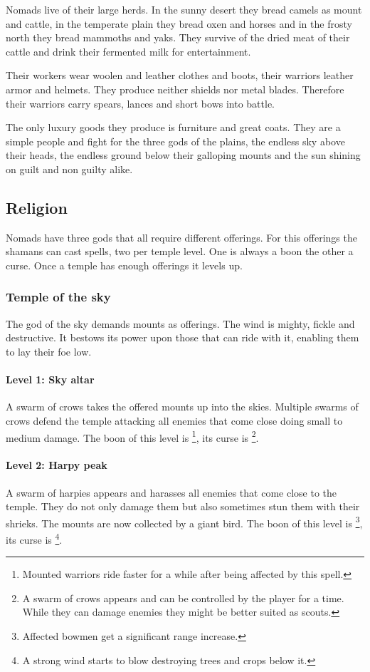 \documentclass[a4paper]{book}
\begin{document}
\Gls{Nomads} live of their large herds. In the sunny desert they bread camels as mount
and cattle, in the temperate plain they bread oxen and horses and in the frosty north
they bread mammoths and yaks.
They survive of the dried meat of their cattle and drink their fermented milk for
entertainment.

Their workers wear woolen and leather clothes and boots, their warriors leather
armor and helmets. They produce neither shields nor metal blades. Therefore
their warriors carry spears, lances and short bows into battle.

The only luxury goods they produce is furniture and great coats. They are a
simple people and fight for the three gods of the plains, the endless sky above
their heads, the endless ground below their galloping mounts and the sun
shining on guilt and non guilty alike.

\subsection{Religion}
\Gls{Nomads} have three gods that all require different offerings.
For this offerings the shamans can cast spells, two per temple level.
One is always a boon the other a curse.
Once a temple has enough offerings it levels up.

\subsubsection{Temple of the sky}
The god of the sky demands mounts as offerings. The wind is mighty, fickle and
destructive. It bestows its power upon those that can ride with it, enabling
them to lay their foe low.

\paragraph{Level 1: Sky altar}
A swarm of crows takes the offered mounts up into the skies. Multiple swarms of
crows defend the temple attacking all enemies that come close doing small to
medium damage. The boon of this level is \footnote{ Mounted warriors ride faster for a while after being affected
	by this spell. }, its curse is \footnote{ A swarm of
	crows appears and can be controlled by the player for a time. While they can
	damage enemies they might be better suited as scouts. }.

\paragraph{Level 2: Harpy peak}
A swarm of harpies appears and harasses all enemies that come close to the
temple. They do not only damage them but also sometimes stun them with their
shrieks. The mounts are now collected by a giant bird. The boon of this level
is \footnote{ Affected bowmen get a significant range
	increase. }, its curse is \footnote{ A strong wind
	starts to blow destroying trees and crops below it. }.
\end{document}
